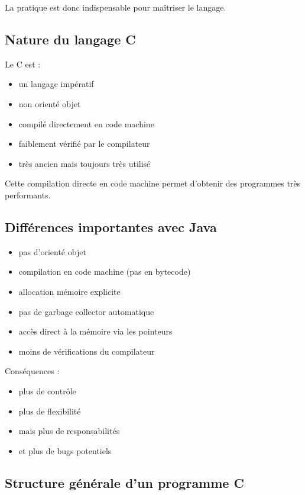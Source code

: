 La pratique est donc indispensable pour maîtriser le langage.

\subsection{Nature du langage C}

Le C est :

\begin{itemize}
    \item un langage impératif
    \item non orienté objet
    \item compilé directement en code machine
    \item faiblement vérifié par le compilateur
    \item très ancien mais toujours très utilisé
\end{itemize}

Cette compilation directe en code machine permet d’obtenir des programmes très performants.

\subsection{Différences importantes avec Java}

\begin{itemize}
    \item pas d’orienté objet
    \item compilation en code machine (pas en bytecode)
    \item allocation mémoire explicite
    \item pas de garbage collector automatique
    \item accès direct à la mémoire via les pointeurs
    \item moins de vérifications du compilateur
\end{itemize}

Conséquences :

\begin{itemize}
    \item plus de contrôle
    \item plus de flexibilité
    \item mais plus de responsabilités
    \item et plus de bugs potentiels
\end{itemize}

\subsection{Structure générale d’un programme C}

